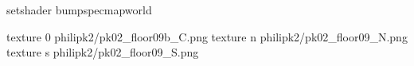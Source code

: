 setshader bumpspecmapworld

texture 0 philipk2/pk02_floor09b_C.png
texture n philipk2/pk02_floor09_N.png
texture s philipk2/pk02_floor09_S.png


